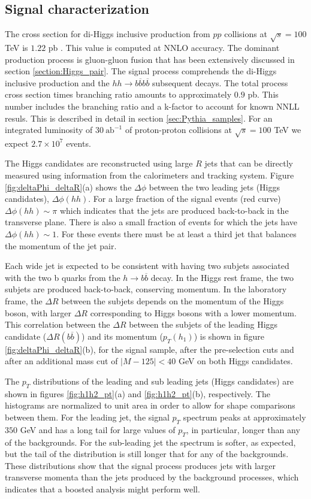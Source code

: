 \subsection{Signal characterization}

The cross section for di-Higgs inclusive production from $pp$ collisions at $\sqrt{s}=100$ TeV is $1.22$ pb \cite{HxsNNLO}. This value is computed at NNLO accuracy. The dominant production process is gluon-gluon fusion that has been extensively discussed in section \ref{section:Higgs_pair}. The signal process comprehends the di-Higgs inclusive production and the $hh\rightarrow b\overline{b}b\overline{b}$ subsequent decays. The total process cross section times branching ratio amounts to approximately $0.9$ pb. This number includes the branching ratio and a k-factor to account for known NNLL resuls. This is described in detail in section \ref{sec:Pythia_samples}. For an integrated luminosity of $30~\text{ab}^{-1}$ of proton-proton collisions at $\sqrt{s}=100$ TeV we expect $2.7\times 10^{7}$ events.

The Higgs candidates are reconstructed using large $R$ jets that can be directly measured using information from the calorimeters and tracking system. Figure \ref{fig:deltaPhi_deltaR}(a) shows the $\Delta\phi$ between the two leading jets (Higgs candidates), $\Delta\phi(hh)$. For a large fraction of the signal events (red curve) $\Delta\phi(hh)\sim \pi$ which indicates that the jets are produced back-to-back in the transverse plane. There is also a small fraction of events for which the jets have $\Delta\phi(hh)\sim 1$. For these events there must be at least a third jet that balances the momentum of the jet pair. 

Each wide jet is expected to be consistent with having two subjets associated with the two b quarks from the $h\rightarrow b\overline{b}$ decay. In the Higgs rest frame, the two subjets are produced back-to-back, conserving momentum. In the laboratory frame, the $\Delta R$ between the subjets depends on the momentum of the Higgs boson, with larger $\Delta R$ corresponding to Higgs bosons with a lower momentum. This correlation between the $\Delta R$ between the subjets of the leading Higgs candidate ($\Delta R(b\overline{b})$) and its momentum ($p_T(h_1)$) is shown in figure \ref{fig:deltaPhi_deltaR}(b), for the signal sample, after the pre-selection cuts and after an additional mass cut of $|M-125|<40$ GeV on both Higgs candidates.

The $p_T$ distributions of the leading and sub leading jets (Higgs candidates) are shown in figures \ref{fig:h1h2_pt}(a) and \ref{fig:h1h2_pt}(b), respectively. The histograms are normalized to unit area in order to allow for shape comparisons between them. For the leading jet, the signal $p_T$ spectrum peaks at approximately $350$ GeV and has a long tail for large values of $p_T$, in particular, longer than any of the backgrounds. For the sub-leading jet the spectrum is softer, as expected, but the tail of the distribution is still longer that for any of the backgrounds. These distributions show that the signal process produces jets with larger transverse momenta than the jets produced by the background processes, which indicates that a boosted analysis might perform well.

